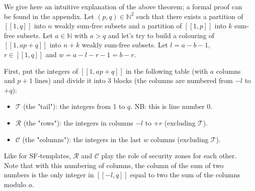 We give here an intuitive explanation of the above theorem; a formal proof can be found in the appendix. 
Let \((p, q) \in \mathbb{N}^2\) such that there exists a partition of \([\![1,q]\!]\) into \(n\) weakly sum-free
subsets and a partition of \([\![1,p]\!]\) into \(k\) sum-free subsets. Let \(a \in \mathbb{N}\) with \(a > q\) 
and let's try to build a colouring of \([\![1, ap + q]\!]\) into \(n + k\) weakly sum-free subsets. Let 
\(l = a - b - 1\), \(r \in [\![1,q]\!]\) and \(w = a - l - r - 1 = b - r\).

First, put the integers of \([\![1, ap + q]\!]\) in the following table (with \(a\) columns and \(p + 1\) lines) and divide it into 3 blocks (the columns are numbered from \(-l\) to \(+q\)):

\begin{itemize}
	\item \(\mathcal{T}\) (the "tail"): the integers from 1 to \(q\). NB: this is line number 0.
	\item \(\mathcal{R}\) (the "rows"): the integers in columns \(-l\) to \(+r\) (excluding  \(\mathcal{T}\)).
	\item \(\mathcal{C}\) (the "columns"): the integers in the last \(w\) columns (excluding  \(\mathcal{T}\)).
\end{itemize}

Like for SF-templates, \(\mathcal{R}\) and \(\mathcal{C}\) play the role of security zones for each other. Note that with
this numbering of columns, the column of the sum of two numbers is the only integer in \([\![-l,q]\!]\) equal to two the
sum of the columns modulo \(a\).

